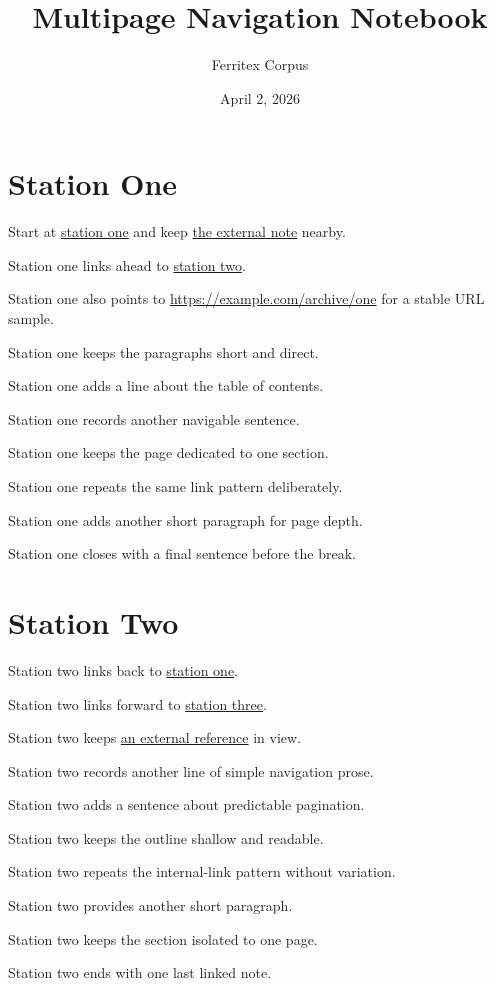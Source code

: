 \documentclass{article}
\title{Multipage Navigation Notebook}
\author{Ferritex Corpus}
\date{April 2, 2026}
\begin{document}
\maketitle
\tableofcontents
\newpage

\section{Station One}
\label{sec:station-one}
Start at \hyperref[sec:station-one]{station one} and keep \href{https://example.com/one}{the external note} nearby.\par
Station one links ahead to \hyperref[sec:station-two]{station two}.\par
Station one also points to \url{https://example.com/archive/one} for a stable URL sample.\par
Station one keeps the paragraphs short and direct.\par
Station one adds a line about the table of contents.\par
Station one records another navigable sentence.\par
Station one keeps the page dedicated to one section.\par
Station one repeats the same link pattern deliberately.\par
Station one adds another short paragraph for page depth.\par
Station one closes with a final sentence before the break.\par
\newpage

\section{Station Two}
\label{sec:station-two}
Station two links back to \hyperref[sec:station-one]{station one}.\par
Station two links forward to \hyperref[sec:station-three]{station three}.\par
Station two keeps \href{https://example.com/two}{an external reference} in view.\par
Station two records another line of simple navigation prose.\par
Station two adds a sentence about predictable pagination.\par
Station two keeps the outline shallow and readable.\par
Station two repeats the internal-link pattern without variation.\par
Station two provides another short paragraph.\par
Station two keeps the section isolated to one page.\par
Station two ends with one last linked note.\par
\newpage
\end{document}
